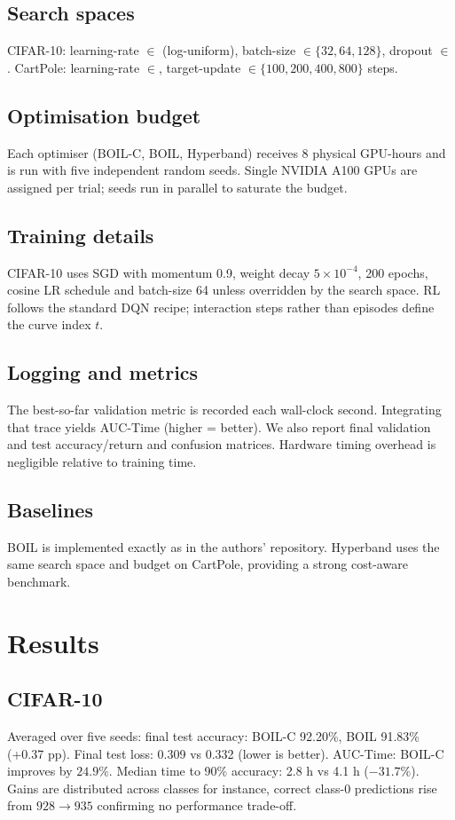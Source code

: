 \documentclass{article} %
\begin{document}
\subsection{Search spaces}
CIFAR-10: learning-rate \(\in\) (log-uniform), batch-size \(\in\{32,64,128\}\), dropout \(\in\). CartPole: learning-rate \(\in\), target-update \(\in\{100,200,400,800\}\) steps.

\subsection{Optimisation budget}
Each optimiser (BOIL-C, BOIL, Hyperband) receives 8 physical GPU-hours and is run with five independent random seeds. Single NVIDIA A100 GPUs are assigned per trial; seeds run in parallel to saturate the budget.

\subsection{Training details}
CIFAR-10 uses SGD with momentum 0.9, weight decay \(5\times 10^{-4}\), 200 epochs, cosine LR schedule and batch-size 64 unless overridden by the search space. RL follows the standard DQN recipe; interaction steps rather than episodes define the curve index \(t\).

\subsection{Logging and metrics}
The best-so-far validation metric is recorded each wall-clock second. Integrating that trace yields AUC-Time (higher = better). We also report final validation and test accuracy/return and confusion matrices. Hardware timing overhead is negligible relative to training time.

\subsection{Baselines}
BOIL is implemented exactly as in the authors' repository. Hyperband uses the same search space and budget on CartPole, providing a strong cost-aware benchmark.

\section{Results}
\label{sec:results}
\subsection{CIFAR-10}
Averaged over five seeds: final test accuracy: BOIL-C 92.20\%, BOIL 91.83\% (+0.37 pp). Final test loss: 0.309 vs 0.332 (lower is better). AUC-Time: BOIL-C improves by \(24.9\%\). Median time to 90\% accuracy: 2.8 h vs 4.1 h (\(-31.7\%\)). Gains are distributed across classes for instance, correct class-0 predictions rise from \(928\rightarrow 935\) confirming no performance trade-off.
\end{document}
